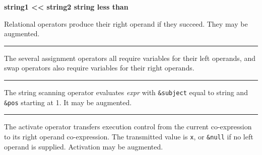 

\noindent
{\bf string1 {\textless}{\textless} string2 \hfill string less than}






\noindent
Relational operators produce their right operand if they succeed. They
may be augmented.

\bigskip\hrule\vspace{0.1cm}





\noindent The several assignment
operators all require variables for their left operands, and swap
operators also require variables for their right operands.

\bigskip\hrule\vspace{0.1cm}

\noindent
{}The string scanning operator evaluates \textit{expr}
with \texttt{\&subject} equal to string and \texttt{\&pos} starting at
1. It may be augmented.

\bigskip\hrule\vspace{0.1cm}

\noindent The activate operator transfers execution
control from the current co-expression to its right operand
co-expression. The transmitted value is \texttt{x}, or \texttt{\&null}
if no left operand is supplied. Activation may be augmented.

